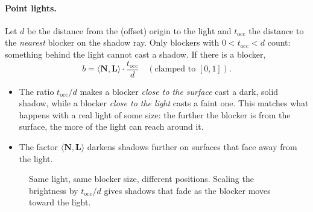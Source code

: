 \documentclass[11pt,a4paper]{article}
\newcommand{\vv}[1]{\mathbf{#1}}
\newcommand{\dotp}[2]{\langle #1, #2\rangle}
\begin{document}
\paragraph{Point lights.} Let $d$ be the distance from the (offset) origin to the
light and $t_{\text{occ}}$ the distance to the \emph{nearest} blocker on the
shadow ray. Only blockers with $0<t_{\text{occ}}<d$ count: something behind the
light cannot cast a shadow. If there is a blocker,
\[
  b = \dotp{\vv N}{\vv L}\cdot\frac{t_{\text{occ}}}{d}\quad(\text{clamped to }[0,1]).
\]
\begin{itemize}[leftmargin=1.4em]
  \item The ratio $t_{\text{occ}}/d$ makes a blocker \emph{close to the
        surface} cast a dark, solid shadow, while a blocker \emph{close to the
        light} casts a faint one. This matches what happens with a real light of
        some size: the further the blocker is from the surface, the more of the
        light can reach around it.
  \item The factor $\dotp{\vv N}{\vv L}$ darkens shadows further on surfaces
        that face away from the light.
\end{itemize}

\begin{figure}[h]
\centering
{}
\caption{Same light, same blocker size, different positions. Scaling the
brightness by $t_{\text{occ}}/d$ gives shadows that fade as the blocker moves
toward the light.}
\end{figure}
\end{document}
